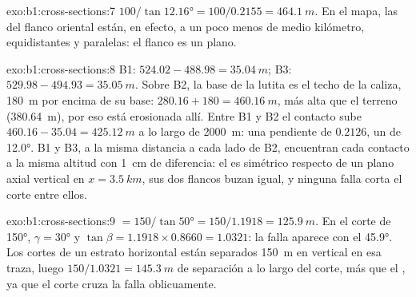 \begin{solution}{exo:b1:cross-sections:7}
$100/\tan\ang{12.16} = 100/0.2155 = \qty{464.1}{m}$. En el mapa, las  del flanco oriental están, en efecto, a un poco menos de medio kilómetro, equidistantes
y paralelas: el flanco es un plano.
\end{solution}

\begin{solution}{exo:b1:cross-sections:8}
B1: $524.02 - 488.98 = \qty{35.04}{m}$; B3: $529.98 - 494.93 =
\qty{35.05}{m}$. Sobre B2, la base de la lutita es el techo de la caliza, \qty{180}{m} por encima de
su base: $280.16 + 180 = \qty{460.16}{m}$, más alta que el terreno (\qty{380.64}{m}), por eso está
erosionada allí. Entre B1 y B2 el contacto sube $460.16 - 35.04 = \qty{425.12}{m}$ a lo largo de
\qty{2000}{m}: una pendiente de $0.2126$, un  de \ang{12.0}. B1 y B3, a la misma
distancia a cada lado de B2, encuentran cada contacto a la misma altitud con \qty{1}{cm} de
diferencia: el  es simétrico respecto de un plano axial vertical en $x = \qty{3.5}{km}$, sus
dos flancos buzan igual, y ninguna falla corta el corte entre ellos.
\end{solution}

\begin{solution}{exo:b1:cross-sections:9}
 $= 150/\tan\ang{50} = 150/1.1918 = \qty{125.9}{m}$. En el corte de 
\ang{150}, $\gamma = \ang{30}$ y $\tan\beta = 1.1918\times0.8660 =
1.0321$: la falla aparece con el  \ang{45.9}. Los cortes de un estrato horizontal
están separados \qty{150}{m} en vertical en esa traza, luego $150/1.0321 = \qty{145.3}{m}$ de
separación a lo largo del corte, más que el , ya que el corte cruza la falla
oblicuamente.
\end{solution}


